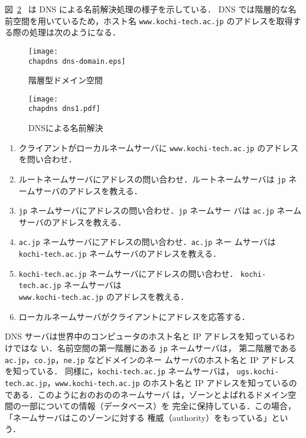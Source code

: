 図~\ref{fig:05:dns-dns}~ は DNS による名前解決処理の様子を示している．
DNS では階層的な名前空間を用いているため，ホスト名 
\verb|www.kochi-tech.ac.jp| のアドレスを取得する際の処理は次のようになる．

\begin{figure}[ht]
  \begin{center}
   \texttt{[image: \\chapdns dns-domain.eps]}
   \vspace*{1zh}
   \caption{階層型ドメイン空間}
   \label{fig:05:dns-domain}
  \end{center}
 \end{figure}

 \begin{figure}[ht]
   \begin{center}
    \texttt{[image: \\chapdns dns1.pdf]}
    \vspace*{1zh}
    \caption{DNSによる名前解決}
    \label{fig:05:dns-dns}
   \end{center}
  \end{figure}
  
  \begin{enumerate}
   \item クライアントがローカルネームサーバに %
         \verb|www.kochi-tech.ac.jp| のアドレスを問い合わせ．
   \item ルートネームサーバにアドレスの問い合わせ．ルートネームサーバは %
         \verb|jp| ネームサーバのアドレスを教える．
   \item \verb|jp| ネームサーバにアドレスの問い合わせ．\verb|jp| ネームサー
         バは \verb|ac.jp| ネームサーバのアドレスを教える．
   \item \verb|ac.jp| ネームサーバにアドレスの問い合わせ．\verb|ac.jp| ネー
         ムサーバは \verb|kochi-tech.ac.jp| ネームサーバのアドレスを教える．
   \item \verb|kochi-tech.ac.jp| ネームサーバにアドレスの問い合わせ．%
         \verb|kochi-tech.ac.jp| ネームサーバは\\
         \verb|www.kochi-tech.ac.jp| のアドレスを教える．
   \item ローカルネームサーバがクライアントにアドレスを応答する．
  \end{enumerate}
  
DNS サーバは世界中のコンピュータのホスト名と IP アドレスを知っているわけではな
い．名前空間の第一階層にある \verb|jp| ネームサーバは，
第二階層である \verb|ac.jp|，\verb|co.jp|，\verb|ne.jp| などドメインのネー
ムサーバのホスト名と IP アドレスを知っている．
同様に，\verb|kochi-tech.ac.jp| ネームサーバは，
\verb|ugs.kochi-tech.ac.jp|，\verb|www.kochi-tech.ac.jp| のホスト名と IP %
アドレスを知っているのである．このようにおのおののネームサーバ
は，ゾーンとよばれるドメイン空間の一部についての情報（データベース）を
完全に保持している．この場合，「ネームサーバはこのゾーンに対する
権威（authority）をもっている」という．

